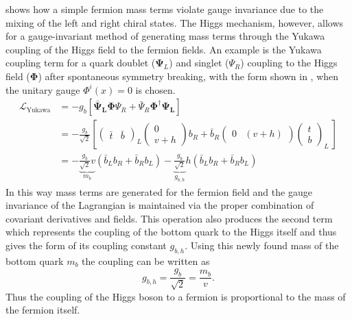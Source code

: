  shows how a simple fermion mass terms violate gauge
invariance due to the mixing of the left and right chiral states.  The Higgs
mechanism, however, allows for a gauge-invariant method of generating mass
terms through the Yukawa coupling of the Higgs field to the fermion fields.  An
example is the Yukawa coupling term for a quark doublet
($\boldsymbol{\Psi}_{L}$) and singlet ($\Psi_R$) coupling to the Higgs field
($\boldsymbol{\Phi}$) after spontaneous symmetry breaking, with the form
shown in , when the unitary gauge $\Phi^{i}(x) = 0$
is chosen.
%
\begin{align}
\mathcal{L}_{\text{Yukawa}} &= - g_{b} \left[ \boldsymbol{\bar{\Psi}_L}
\boldsymbol{\Phi} \Psi_R + \bar{\Psi}_{R} \boldsymbol{\Phi}^{\dagger} \boldsymbol{\Psi_L}
\right] \\ &= - \frac{g_{b}}{\sqrt{2}} \left[ \left( \begin{matrix}
\bar{t} & \bar{b} \end{matrix} \right)_L \left( \begin{matrix} 0 \\ v +
h \end{matrix} \right) b_{R} + \bar{b}_{R} \left( \begin{matrix} 0 & (v + h)
\end{matrix} \right) \left( \begin{matrix} t \\ b \end{matrix} \right)_L \ \right] \\ &= - \underbrace{\frac{g_{b}}{\sqrt{2}}
v}_{m_{b}} \left( \bar{b}_{L}b_{R} + \bar{b}_{R}b_{L}  \right)
- \underbrace{\frac{g_{b}}{\sqrt{2}}}_{g_{b,h}} h \left(
\bar{b}_{L}b_{R} + \bar{b}_{R}b_{L}  \right) 
\end{align}
%
In this way mass terms are generated for the fermion field and the gauge
invariance of the Lagrangian is maintained via the proper combination of
covariant derivatives and fields.  This operation also produces the second term
which represents the coupling of the bottom quark to the Higgs itself and thus
gives the form of its coupling constant $g_{b,h}$.  Using this newly found
mass of the bottom quark $m_{b}$ the coupling can be written as
%
\begin{equation}
g_{b,h} = \frac{g_{b}}{\sqrt{2}} = \frac{m_{b}}{v}.
\end{equation}
%
Thus the coupling of the Higgs boson to a fermion is proportional
to the mass of the fermion itself. 
 
